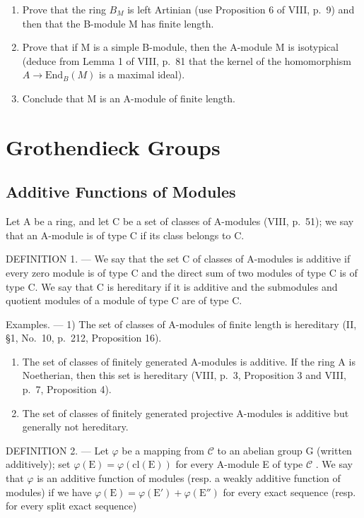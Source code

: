 \begin{enumerate}
\def\labelenumi{\alph{enumi})}
\item
  Prove that the ring \(B_{M}\) is left Artinian (use Proposition 6 of VIII, p.~9) and then that the B-module M has finite length.
\item
  Prove that if M is a simple B-module, then the A-module M is isotypical (deduce from Lemma 1 of VIII, p.~81 that the kernel of the homomorphism \(A \rightarrow \text{End}_{B}(M)\) is a maximal ideal).
\item
  Conclude that M is an A-module of finite length.
\end{enumerate}

\section{Grothendieck Groups}

\subsection{Additive Functions of Modules}

Let A be a ring, and let C be a set of classes of A-modules (VIII, p.~51); we say that an A-module is of type C if its class belongs to C.

DEFINITION 1. --- We say that the set C of classes of A-modules is additive if every zero module is of type C and the direct sum of two modules of type C is of type C. We say that C is hereditary if it is additive and the submodules and quotient modules of a module of type C are of type C.

Examples. --- 1) The set of classes of A-modules of finite length is hereditary (II, §1, No.~10, p.~212, Proposition 16).

\begin{enumerate}
\def\labelenumi{\arabic{enumi})}
\setcounter{enumi}{1}
\item
  The set of classes of finitely generated A-modules is additive. If the ring A is Noetherian, then this set is hereditary (VIII, p.~3, Proposition 3 and VIII, p.~7, Proposition 4).
\item
  The set of classes of finitely generated projective A-modules is additive but generally not hereditary.
\end{enumerate}

DEFINITION 2. --- Let \(\varphi\) be a mapping from \(\mathcal{C}\) to an abelian group G (written additively); set \(\varphi(\mathrm{E}) = \varphi(\mathrm{cl}(\mathrm{E}))\) for every A-module E of type \(\mathcal{C}\) . We say that \(\varphi\) is an additive function of modules (resp. a weakly additive function of modules) if we have \(\varphi(\mathrm{E}) = \varphi(\mathrm{E}') + \varphi(\mathrm{E}'')\) for every exact sequence (resp. for every split exact sequence)

